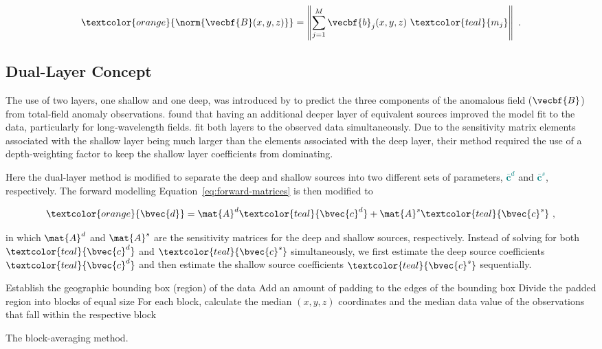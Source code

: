 \begin{equation}
\textcolor{orange}{\norm{\vecbf{B}(x,y,z)}} = \left\lVert
    \sum_{j=1}^{M} \vecbf{b}_{j}(x,y,z)\ \textcolor{teal}{m_j}
\right\rVert
\ .
\end{equation}


\subsection{Dual-Layer Concept}

The use of two layers, one shallow and one deep, was introduced by \citet{Li2020} to predict the three components of the anomalous field ($\vecbf{B}$) from total-field anomaly observations. \citet{Li2020} found that having an additional deeper layer of equivalent sources improved the model fit to the data, particularly for long‐wavelength fields. \citet{Li2020} fit both layers to the observed data simultaneously. Due to the sensitivity matrix elements associated with the shallow layer being much larger than the elements associated with the deep layer, their method required the use of a depth-weighting factor to keep the shallow layer coefficients from dominating.

Here the dual-layer method is modified to separate the deep and shallow sources into two different sets of parameters, \textcolor{teal}{$\bar{\mathbf{c}}^d$} and \textcolor{teal}{$\bar{\mathbf{c}}^s$}, respectively.
The forward modelling Equation~\ref{eq:forward-matrices} is then modified to

\begin{equation}
    \textcolor{orange}{\bvec{d}} = \mat{A}^d \textcolor{teal}{\bvec{c}^d}
    +  \mat{A}^s \textcolor{teal}{\bvec{c}^s}
    \ ,
\end{equation}

\noindent
in which $\mat{A}^d$ and $\mat{A}^s$ are the sensitivity matrices for the deep and shallow sources, respectively.
Instead of solving for both $\textcolor{teal}{\bvec{c}^d}$ and $\textcolor{teal}{\bvec{c}^s}$ simultaneously, we first estimate the deep source coefficients $\textcolor{teal}{\bvec{c}^d}$ and then estimate the shallow source coefficients $\textcolor{teal}{\bvec{c}^s}$ sequentially.

\begin{algorithm}[!htb]
  Establish the geographic bounding box (region) of the data
  \;
  Add an amount of padding to the edges of the bounding box
  \;
  Divide the padded region into blocks of equal size
  \;
  For each block, calculate the median $(x, y, z)$ coordinates and the median data value of the observations that fall within the respective block
  \;
  \BlankLine
  \caption{The block-averaging method.}
  \label{alg:block_averaging}
\end{algorithm}

